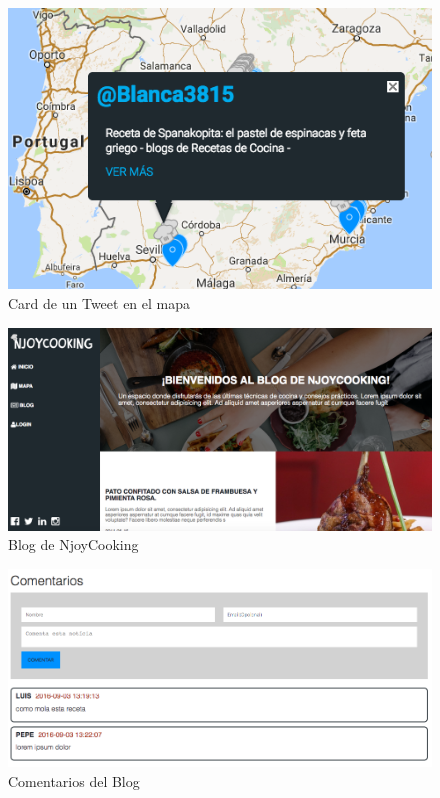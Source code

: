 \begin{figure}
\begin{center}
\includegraphics[width=1.0\textwidth]{imagenes/card-resultado.png}
\caption{Card de un Tweet en el mapa}
\label{card-resultado}
\end{center}
\end{figure}

\begin{figure}
\begin{center}
\includegraphics[width=1.0\textwidth]{imagenes/blog-resultado.png}
\caption{Blog de NjoyCooking}
\label{blog-resultado}
\end{center}
\end{figure}

\begin{figure}
\begin{center}
\includegraphics[width=1.0\textwidth]{imagenes/comments-resultado.png}
\caption{Comentarios del Blog}
\label{comments-resultado}
\end{center}
\end{figure}

